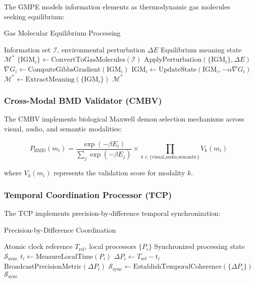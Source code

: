 \documentclass[12pt,a4paper]{article}
\begin{document}
The GMPE models information elements as thermodynamic gas molecules seeking equilibrium:

\begin{algorithm}
\caption{Gas Molecular Equilibrium Processing}
\begin{algorithmic}[1]
\Require Information set $\mathcal{I}$, environmental perturbation $\Delta E$
\Ensure Equilibrium meaning state $\mathcal{M}^*$
\State $\{\text{IGM}_i\} \leftarrow \text{ConvertToGasMolecules}(\mathcal{I})$
\State $\text{ApplyPerturbation}(\{\text{IGM}_i\}, \Delta E)$
\Repeat
        \State $\nabla G_i \leftarrow \text{ComputeGibbsGradient}(\text{IGM}_i)$
        \State $\text{IGM}_i \leftarrow \text{UpdateState}(\text{IGM}_i, -\alpha \nabla G_i)$
    \EndFor
{}
\State $\mathcal{M}^* \leftarrow \text{ExtractMeaning}(\{\text{IGM}_i\})$
\Return $\mathcal{M}^*$
\end{algorithmic}
\end{algorithm}

\subsubsection{Cross-Modal BMD Validator (CMBV)}

The CMBV implements biological Maxwell demon selection mechanisms across visual, audio, and semantic modalities:

\begin{equation}
P_{\text{BMD}}(m_i) = \frac{\exp(-\beta E_i)}{\sum_j \exp(-\beta E_j)} \times \prod_{k \in \{\text{visual,audio,semantic}\}} V_k(m_i)
\end{equation}

where $V_k(m_i)$ represents the validation score for modality $k$.

\subsubsection{Temporal Coordination Processor (TCP)}

The TCP implements precision-by-difference temporal synchronization:

\begin{algorithm}
\caption{Precision-by-Difference Coordination}
\begin{algorithmic}[1]
\Require Atomic clock reference $T_{\text{ref}}$, local processors $\{P_i\}$
\Ensure Synchronized processing state $\mathcal{S}_{\text{sync}}$
    \State $t_i \leftarrow \text{MeasureLocalTime}(P_i)$
    \State $\Delta P_i \leftarrow T_{\text{ref}} - t_i$
    \State $\text{BroadcastPrecisionMetric}(\Delta P_i)$
\EndFor
\State $\mathcal{S}_{\text{sync}} \leftarrow \text{EstablishTemporalCoherence}(\{\Delta P_i\})$
\Return $\mathcal{S}_{\text{sync}}$
\end{algorithmic}
\end{algorithm}
\end{document}
